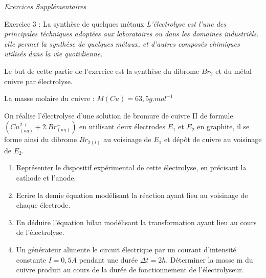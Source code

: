 \documentclass[12pt, french]{article}
\begin{document}
\begin{center}
   \Large{ \em{Exercices Supplémentaires}}
\end{center}


\begin{Box2}{Exercice 3 : La synthèse de quelques métaux}
	\emph{L’électrolyse est l’une des principales téchniques adoptées aux laboratoires ou dans
les domaines industrièls. elle permet la synthèse de quelques métaux, et d’autres
composés chimiques utilisés dans la vie quotidienne.}

Le but de cette partie de l’exercice est la synthèse du dibrome $Br_2$ et du métal cuivre
par électrolyse.

La masse molaire du cuivre : $M(Cu) = 63,5 g.mol^{-1}$


On réalise l’électrolyse d’une solution de bromure de cuivre II de formule $(Cu^{2+}_{(aq)}+2.Br^-_{(aq)})$ en utilisant deux électrodes $E_1$ et $E_2$ en graphite, il se forme ainsi du
dibrome $Br_{2(l)}$ au voisinage de $E_1$ et dépôt de cuivre au voisinage de $E_2$.

\begin{enumerate}
	\item  Représenter le dispositif expérimental de cette électrolyse, en précisant la
cathode et l’anode.
\item  Ecrire la demie équation modélisant la réaction ayant lieu au voisinage de
chaque électrode.
\item  En déduire l’équation bilan modélisant la transformation ayant lieu au cours de
l’électrolyse.
\item Un générateur alimente le circuit électrique par un courant d’intensité constante
	$I = 0,5 A$ pendant une durée $\Delta{t} = 2 h$.
Déterminer la masse m du cuivre produit au cours de la durée de fonctionnement
de l’électrolyseur.
\end{enumerate}
\end{Box2}
\end{document}
